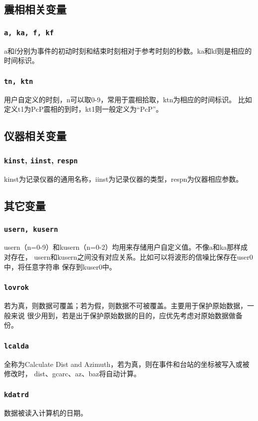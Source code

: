\subsection{震相相关变量}
\subsubsection{\texttt{a, ka, f, kf}}
a和f分别为事件的初动时刻和结束时刻相对于参考时刻的秒数。ka和kf则是相应的时间标识。

\subsubsection{\texttt{tn, ktn}}
用户自定义的时刻，n可以取0-9，常用于震相拾取，ktn为相应的时间标识。
比如定义t1为PcP震相的到时，kt1则一般定义为``PcP''。

\subsection{仪器相关变量}
\subsubsection{\texttt{kinst}, \texttt{iinst}\dag, \texttt{respn}\dag}
kinst为记录仪器的通用名称，iinst为记录仪器的类型，respn为仪器相应参数。

\subsection{其它变量}
\subsubsection{\texttt{usern, kusern}}
usern（n=0-9）和kusern（n=0-2）均用来存储用户自定义值。不像a和ka那样成对存在，
usern和kusern之间没有对应关系。比如可以将波形的信噪比保存在user0中，将任意字符串
保存到kuser0中。

\subsubsection{\texttt{lovrok}}
若为真，则数据可覆盖；若为假，则数据不可被覆盖。主要用于保护原始数据，一般来说
很少用到，若是出于保护原始数据的目的，应优先考虑对原始数据做备份。

\subsubsection{\texttt{lcalda}}
全称为Calculate Dist and Azimuth，若为真，则在事件和台站的坐标被写入或被修改时，
dist、gcarc、az、baz将自动计算。

\subsubsection{\texttt{kdatrd}}
数据被读入计算机的日期。
